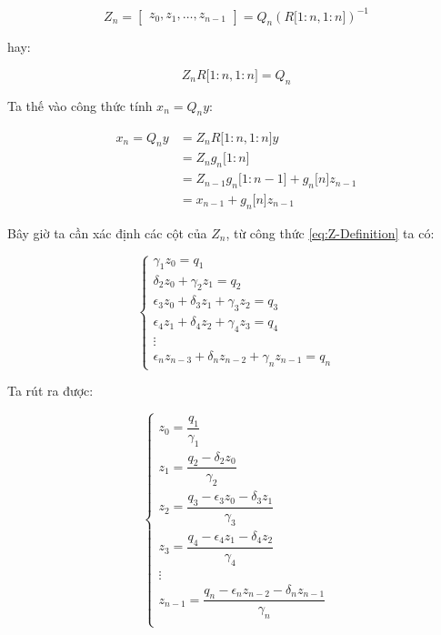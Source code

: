 \documentclass[14pt, a4paper]{article}
\numberwithin{equation}{section}
\numberwithin{algorithm}{section}
\numberwithin{figure}{section}
\numberwithin{dl}{section}
\numberwithin{md}{section}
\numberwithin{bd}{section}
\numberwithin{dn}{section}
\numberwithin{hq}{section}
\begin{document}
\begin{equation}
    Z_n = \begin{bmatrix}
        z_0, z_1, \dots, z_{n-1}
    \end{bmatrix}=Q_n (R\lbrack 1:n, 1:n \rbrack)^{-1}
\end{equation}

hay:

\begin{equation} \label{eq:Z-Definition}
    Z_n R\lbrack 1:n, 1:n \rbrack = Q_n
\end{equation}

Ta thế vào công thức tính $x_n = Q_n y$:

\begin{equation}
    \begin{aligned}
        x_n = Q_n y &= Z_n  R\lbrack 1:n, 1:n \rbrack y \\
        &= Z_n g_n \lbrack 1:n \rbrack \\
        &=Z_{n-1}g_n \lbrack 1:n-1 \rbrack+g_n\lbrack n \rbrack z_{n-1}\\
        &=x_{n-1} + g_n\lbrack n \rbrack z_{n-1}
    \end{aligned}
\end{equation}

Bây giờ ta cần xác định các cột của $Z_n$, từ công thức \ref{eq:Z-Definition} ta có:

\begin{equation}
    \begin{cases}
        \gamma_1 z_0 = q_1 \\
        \delta_2 z_0 + \gamma_2 z_1 = q_2 \\
        \epsilon_3 z_0 + \delta_3 z_1 + \gamma_3 z_2 = q_3 \\
        \epsilon_4 z_1 + \delta_4 z_2 + \gamma_4 z_3 = q_4 \\
        \vdots \\
        \epsilon_n z_{n-3} + \delta_n z_{n-2} + \gamma_n z_{n-1} = q_n
    \end{cases}
\end{equation}

Ta rút ra được:

\begin{equation}
    \begin{cases}
        z_0 = \dfrac{q_1}{\gamma_1}\\
        z_1 = \dfrac{q_2 - \delta_2 z_0}{\gamma_2}\\
        z_2 = \dfrac{q_3 - \epsilon_3 z_0 - \delta_3 z_1}{\gamma_3}\\
        z_3 = \dfrac{q_4 - \epsilon_4 z_1 - \delta_4 z_2}{\gamma_4}\\
        \vdots \\
        z_{n-1} = \dfrac{q_n - \epsilon_n z_{n-2} - \delta_n z_{n-1}}{\gamma_n} \\
    \end{cases}
\end{equation}
\end{document}
